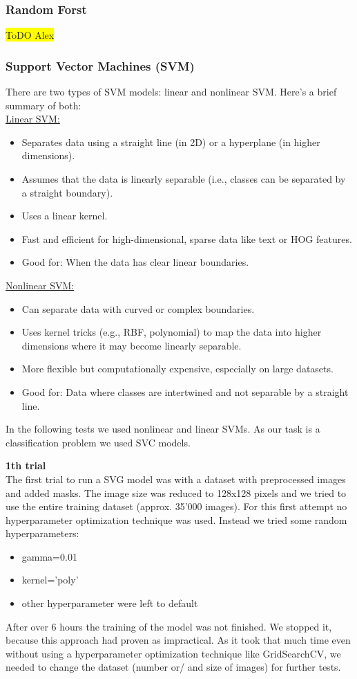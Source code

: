 \documentclass{article}
\begin{document}
\subsubsection{Random Forst}
\colorbox{yellow}{ToDO Alex}

\subsubsection{Support Vector Machines (SVM)}
There are two types of SVM models: linear and nonlinear SVM. Here's a brief summary of both: \\
\underline{Linear SVM:}
\begin{itemize}
    \item Separates data using a straight line (in 2D) or a hyperplane (in higher dimensions).
    \item Assumes that the data is linearly separable (i.e., classes can be separated by a straight boundary).
    \item Uses a linear kernel.
    \item Fast and efficient for high-dimensional, sparse data like text or HOG features.
    \item Good for: When the data has clear linear boundaries.
\end{itemize}
\underline{Nonlinear SVM:}
\begin{itemize}
    \item Can separate data with curved or complex boundaries.
    \item Uses kernel tricks (e.g., RBF, polynomial) to map the data into higher dimensions where it may become linearly separable.
    \item More flexible but computationally expensive, especially on large datasets.
    \item Good for: Data where classes are intertwined and not separable by a straight line.
\end{itemize}

In the following tests we used nonlinear and linear SVMs. As our task  is a classification problem we used SVC models.

\textbf{1th trial}\\
The first trial to run a SVG model was with a dataset with preprocessed images and added masks. The image size was reduced to 128x128 pixels and we tried 
to use the entire training dataset (approx. 35'000 images). For this first attempt no hyperparameter optimization technique was used. Instead we tried some random 
hyperparameters: 
\begin{itemize}
    \item gamma=0.01
    \item kernel='poly'
    \item other hyperparameter were left to default
\end{itemize}
After over 6 hours the training of the model was not finished. We stopped it, because this approach had proven as impractical. As it took that much time even without
using a hyperparameter optimization technique like GridSearchCV, we needed to change the dataset (number or/ and size of images) for further tests.
\end{document}
